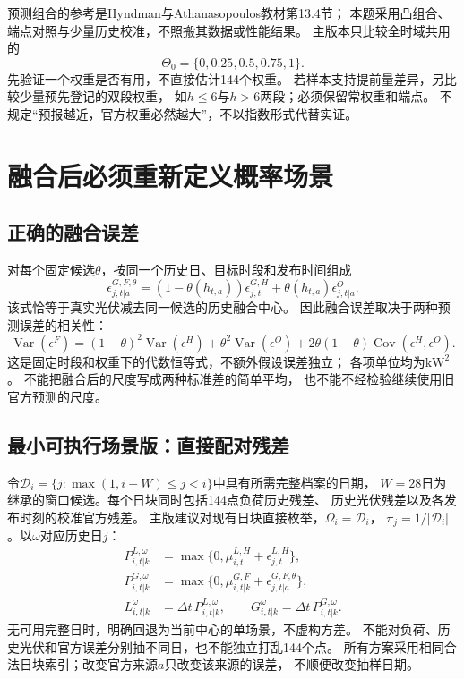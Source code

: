 \documentclass[UTF8,11pt]{ctexart}
\begin{document}
预测组合的参考是Hyndman与Athanasopoulos教材第13.4节\cite{fpp3}；
本题采用凸组合、端点对照与少量历史校准，不照搬其数据或性能结果。
主版本只比较全时域共用的
\begin{equation}
 \Theta_0=\{0,0.25,0.5,0.75,1\}.
\end{equation}
先验证一个权重是否有用，不直接估计144个权重。
若样本支持提前量差异，另比较少量预先登记的双段权重，
如$h\leq6$与$h>6$两段；必须保留常权重和端点。
不规定“预报越近，官方权重必然越大”，不以指数形式代替实证。

\section{融合后必须重新定义概率场景}
\subsection{正确的融合误差}
对每个固定候选$\theta$，按同一个历史日、目标时段和发布时间组成
\begin{equation}\label{eq:fusedres}
 \epsilon^{G,F,\theta}_{j,t|a}
 =(1-\theta(h_{t,a}))\epsilon^{G,H}_{j,t}
                  +\theta(h_{t,a})\epsilon^O_{j,t|a}.
\end{equation}
该式恰等于真实光伏减去同一候选的历史融合中心。
因此融合误差取决于两种预测误差的相关性：
\begin{equation}
 \operatorname{Var}(\epsilon^F)
 =(1-\theta)^2\operatorname{Var}(\epsilon^H)
 +\theta^2\operatorname{Var}(\epsilon^O)
 +2\theta(1-\theta)\operatorname{Cov}(\epsilon^H,\epsilon^O).
\end{equation}
这是固定时段和权重下的代数恒等式，不额外假设误差独立；
各项单位均为$\mathrm{kW}^2$。
不能把融合后的尺度写成两种标准差的简单平均，
也不能不经检验继续使用旧官方预测的尺度。

\subsection{最小可执行场景版：直接配对残差}
令$\mathcal D_i=\{j:\max(1,i-W)\leq j<i\}$中具有所需完整档案的日期，
$W=28$日为继承的窗口候选。每个日块同时包括144点负荷历史残差、
历史光伏残差以及各发布时刻的校准官方残差。
主版建议对现有日块直接枚举，$\Omega_i=\mathcal D_i$，
$\pi_j=1/|\mathcal D_i|$。以$\omega$对应历史日$j$：
\begin{align}
 P^{L,\omega}_{i,t|k}
 &=\max\{0,\mu^{L,H}_{i,t}+\epsilon^{L,H}_{j,t}\},\\
 P^{G,\omega}_{i,t|k}
 &=\max\{0,\mu^{G,F}_{i,t|k}+\epsilon^{G,F,\theta}_{j,t|a}\},\\
 L^\omega_{i,t|k}&=\Delta t\,P^{L,\omega}_{i,t|k},\qquad
 G^\omega_{i,t|k}=\Delta t\,P^{G,\omega}_{i,t|k}.
\end{align}
无可用完整日时，明确回退为当前中心的单场景，不虚构方差。
不能对负荷、历史光伏和官方误差分别抽不同日，也不能独立打乱144个点。
所有方案采用相同合法日块索引；改变官方来源$a$只改变该来源的误差，
不顺便改变抽样日期。
\end{document}
